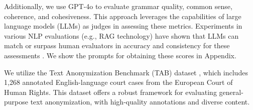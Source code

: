 \documentclass[11pt]{article}
\begin{document}
Additionally, we use GPT-4o to evaluate grammar quality, common sense, coherence, and cohesiveness. This approach leverages the capabilities of large language models (LLMs) as judges in assessing these metrics. Experiments in various NLP evaluations (e.g., RAG technology) have shown that LLMs can match or surpass human evaluators in accuracy and consistency for these assessments \cite{chiang2023can, yu2024evaluation}. We show the prompts for obtaining these scores in Appendix. 

We utilize the Text Anonymization Benchmark (TAB) dataset \citep{pilan2022text}, which includes 1,268 annotated English-language court cases from the European Court of Human Rights. This dataset offers a robust framework for evaluating general-purpose text anonymization, with high-quality annotations and diverse content.








\end{document}
